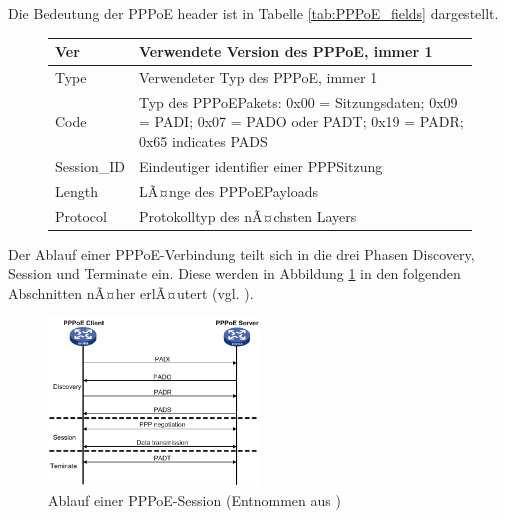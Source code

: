 \documentclass[journal]{IEEEtran}
\begin{document}
%
Die Bedeutung der PPPoE header ist in Tabelle \ref{tab:PPPoE_fields} dargestellt.
%
\begin{figure}[h!]
\begin{tabular}{|l|p{6.5cm}|}
\hline 
Ver & Verwendete Version des PPPoE, immer 1\\ 
\hline 
Type & Verwendeter Typ des PPPoE, immer 1\\ 
\hline 
Code & Typ des PPPoE\-Pakets: 0x00 = Sitzungsdaten; 0x09 = PADI; 0x07 = PADO oder PADT;
0x19 = PADR; 0x65 indicates PADS\\ 
\hline 
Session\_ID & Eindeutiger identifier einer PPP\-Sitzung\\ 
\hline 
Length & LÃ¤nge des PPPoE\-Payloads\\ 
\hline 
Protocol & Protokolltyp des nÃ¤chsten Layers\\ 
\hline
\end{tabular}
\end{figure}
\label{tab:PPPoE_fields}
%
Der Ablauf einer PPPoE-Verbindung teilt sich in die drei Phasen Discovery, Session und Terminate
ein. Diese werden in Abbildung \ref{fig:PPPoEsequenz1} in den folgenden Abschnitten nÃ¤her erlÃ¤utert (vgl. \cite{RFC2516}).\\
%
\begin{figure}[h!]
 \centering
  \includegraphics[width=0.5\textwidth]{img/pppoe_sequenz1.png}
 \caption{Ablauf einer PPPoE-Session (Entnommen aus \cite{PPPoEBild})}
 \label{fig:PPPoEsequenz1}
\end{figure}
\end{document}
